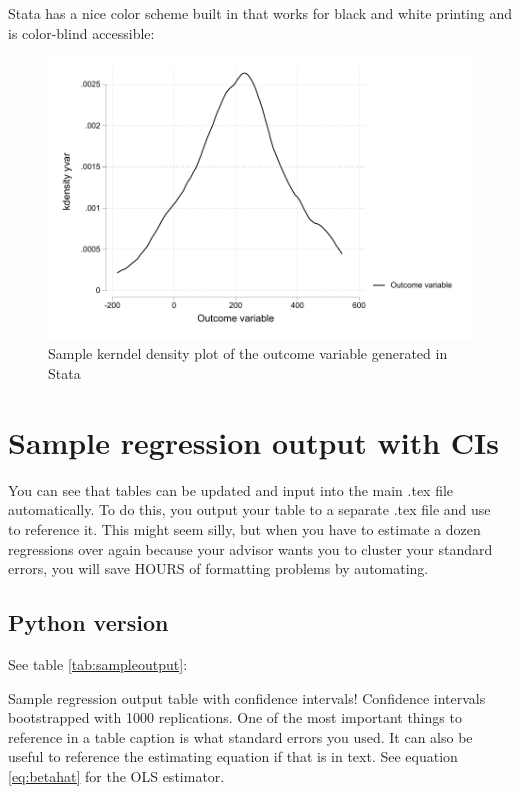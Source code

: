 \documentclass{article}
\begin{document}
Stata has a nice color scheme built in that works for black and white printing and is color-blind accessible:

\begin{figure}[ht]
    \centering
    \includegraphics{statadensity.pdf}
    \caption{Sample kerndel density plot of the outcome variable generated in Stata}
    \label{fig:statahist}
\end{figure}

\section{Sample regression output with CIs}
You can see that tables can be updated and input into the main .tex file automatically.  To do this, you output your table to a separate .tex file and use \verb!  ! to reference it.  This might seem silly, but when you have to estimate a dozen regressions over again because your advisor wants you to cluster your standard errors, you will save HOURS of formatting problems by automating.

\subsection{Python version}

See table \ref{tab:sampleoutput}:

\begin{table}[ht]
    \centering
    
    \caption{Sample regression output table with confidence intervals! Confidence intervals bootstrapped with 1000 replications.  One of the most important things to reference in a table caption is what standard errors you used.  It can also be useful to reference the estimating equation if that is in text. See equation \ref{eq:betahat} for the OLS estimator.}
    \label{tab:sampleoutput}
\end{table}
\end{document}
